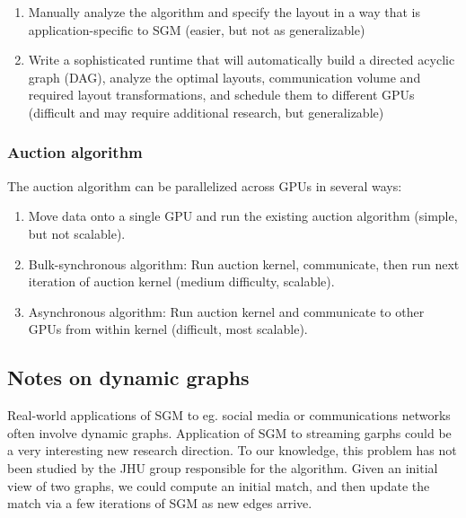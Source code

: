 \documentclass[10pt,oneside]{memoir}
\providecommand{\tightlist}{%
  \setlength{\itemsep}{0pt}\setlength{\parskip}{0pt}}
\begin{document}
\begin{enumerate}
\def\labelenumi{\arabic{enumi}.}
\tightlist
\item
  Manually analyze the algorithm and specify the layout in a way that is
  application-specific to SGM (easier, but not as generalizable)
\item
  Write a sophisticated runtime that will automatically build a directed
  acyclic graph (DAG), analyze the optimal layouts, communication volume
  and required layout transformations, and schedule them to different
  GPUs (difficult and may require additional research, but
  generalizable)
\end{enumerate}

\hypertarget{auction-algorithm}{%
\subsubsection{Auction algorithm}\label{auction-algorithm}}

The auction algorithm can be parallelized across GPUs in several ways:

\begin{enumerate}
\def\labelenumi{\arabic{enumi}.}
\tightlist
\item
  Move data onto a single GPU and run the existing auction algorithm
  (simple, but not scalable).
\item
  Bulk-synchronous algorithm: Run auction kernel, communicate, then run
  next iteration of auction kernel (medium difficulty, scalable).
\item
  Asynchronous algorithm: Run auction kernel and communicate to other
  GPUs from within kernel (difficult, most scalable).
\end{enumerate}

\hypertarget{notes-on-dynamic-graphs-7}{%
\subsection{Notes on dynamic graphs}\label{notes-on-dynamic-graphs-7}}

Real-world applications of SGM to eg. social media or communications
networks often involve dynamic graphs. Application of SGM to streaming
garphs could be a very interesting new research direction. To our
knowledge, this problem has not been studied by the JHU group
responsible for the algorithm. Given an initial view of two graphs, we
could compute an initial match, and then update the match via a few
iterations of SGM as new edges arrive.
\end{document}
